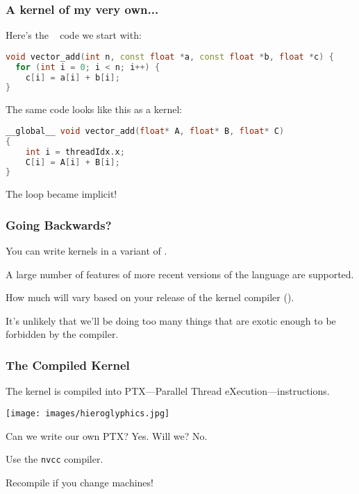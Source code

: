 \begin{frame}[fragile]
\frametitle{A kernel of my very own...}

Here's the \CPP~ code we start with:

\begin{lstlisting}[language=C++]
void vector_add(int n, const float *a, const float *b, float *c) {
  for (int i = 0; i < n; i++) {
    c[i] = a[i] + b[i];
}
\end{lstlisting}


The same code looks like this as a kernel:
\begin{lstlisting}[language=C++]
__global__ void vector_add(float* A, float* B, float* C)
{
    int i = threadIdx.x;
    C[i] = A[i] + B[i];
}
\end{lstlisting}

The loop became implicit!

\end{frame}


\begin{frame}
\frametitle{Going Backwards?}

You can write kernels in a variant of \CPP.


A large number of features of more recent versions of the language are supported.

How much will vary based on your release of the kernel compiler ().

It's unlikely that we'll be doing too many things that are exotic enough to be forbidden by the compiler.

\end{frame}


\begin{frame}
\frametitle{The Compiled Kernel}

The kernel is compiled into PTX---Parallel Thread eXecution---instructions.

\begin{center}
	\texttt{[image: images/hieroglyphics.jpg]}
\end{center}

Can we write our own PTX? Yes. Will we? No.

Use the \texttt{nvcc} compiler.

Recompile if you change machines!

\end{frame}


